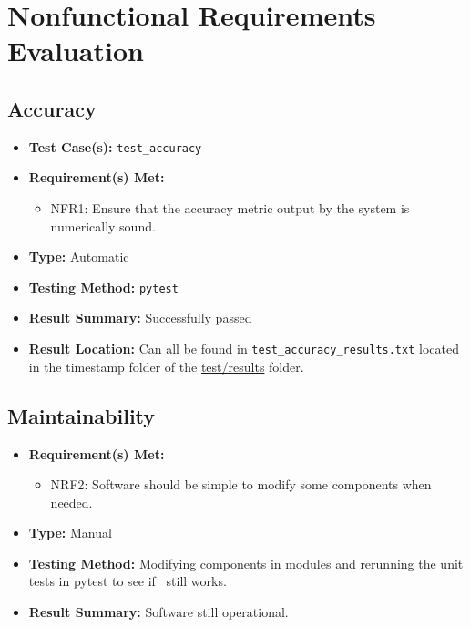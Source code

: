 \documentclass[12pt, titlepage]{article}
\begin{document}
\section{Nonfunctional Requirements Evaluation}

\subsection{Accuracy}
\begin{itemize}
  \item \textbf{Test Case(s): }\texttt{test\_accuracy}
  \item \textbf{Requirement(s) Met: }
  \begin{itemize}
    \item NFR1: Ensure that the accuracy metric output by the system is numerically sound.
  \end{itemize}
  \item \textbf{Type: }Automatic
  \item \textbf{Testing Method: }\texttt{pytest}
  \item \textbf{Result Summary: }Successfully passed
  \item \textbf{Result Location: }Can all be found in \texttt{test\_accuracy\_results.txt} located in the timestamp folder of the \href{https://github.com/AliyahJimoh/2D-Localizer/tree/main/test/results/}{test/results} folder.
\end{itemize}
		
\subsection{Maintainability}
\begin{itemize}
  \item \textbf{Requirement(s) Met: }
  \begin{itemize}
    \item NRF2: Software should be simple to modify some components when
    needed.
  \end{itemize}
  \item \textbf{Type: }Manual
  \item \textbf{Testing Method: }Modifying components in modules and rerunning the unit tests in pytest to see if \progname~still works.
  \item \textbf{Result Summary: }Software still operational.
\end{itemize}
\end{document}
